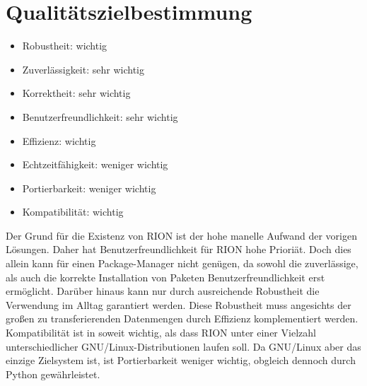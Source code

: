 \chapter{Qualitätszielbestimmung}

\begin{itemize}
	\item Robustheit: wichtig
	\item Zuverlässigkeit: sehr wichtig
	\item Korrektheit: sehr wichtig
	\item Benutzerfreundlichkeit: sehr wichtig
	\item Effizienz: wichtig
	\item Echtzeitfähigkeit: weniger wichtig
	\item Portierbarkeit: weniger wichtig
	\item Kompatibilität: wichtig
\end{itemize}

Der Grund für die Existenz von RION ist der hohe manelle Aufwand der vorigen Lösungen.
Daher hat Benutzerfreundlichkeit für RION hohe Prioriät.
Doch dies allein kann für einen Package-Manager nicht genügen, da sowohl die zuverlässige, als auch die korrekte Installation von Paketen Benutzerfreundlichkeit erst ermöglicht. Darüber hinaus kann nur durch ausreichende Robustheit die Verwendung im Alltag garantiert werden. Diese Robustheit muss angesichts der großen zu transferierenden Datenmengen durch Effizienz komplementiert werden.
Kompatibilität ist in soweit wichtig, als dass RION unter einer Vielzahl unterschiedlicher GNU/Linux-Distributionen laufen soll. Da GNU/Linux aber das einzige Zielsystem ist, ist Portierbarkeit weniger wichtig, obgleich dennoch durch Python gewährleistet.
